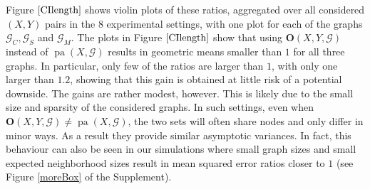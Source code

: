 \documentclass[11pt,a4paper]{article}
\theoremstyle{definition}
\theoremstyle{remark}
\DeclareMathOperator{\pa}{pa}
\newcommand{\g}[1][G]{\mathcal{#1}}
\newcommand{\opt}[2][X,Y]{\mathbf{O}(#1,#2)}
\begin{document}
Figure $\ref{CIlength}$ shows violin plots of these ratios, aggregated over all considered $(X,Y)$ pairs in the 8 experimental settings, with one plot for each of the graphs $\g_C,\g_S$ and $\g_M$.  
The plots in Figure $\ref{CIlength}$ show that using $\opt{\g}$ instead of $\pa(X,\g)$ results in geometric means smaller than $1$ for all three graphs. In particular, only few of the ratios are larger than $1$, with only one larger than $1.2$, showing that this gain is obtained at little risk of a potential downside. The gains are rather modest, however. This is likely due to the small size and sparsity of the considered graphs. In such settings, even when $\opt{\g}\neq\pa(X,\g)$, the two sets will often share nodes and only differ in minor ways. As a result they provide similar asymptotic variances. In fact, this behaviour can also be seen in our simulations where small graph sizes and small expected neighborhood sizes result in mean squared error ratios closer to $1$ (see Figure \ref{moreBox} of the Supplement).
\end{document}
